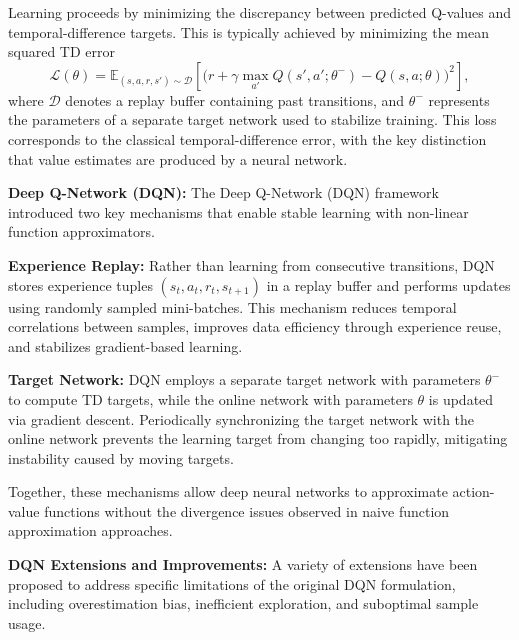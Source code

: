 Learning proceeds by minimizing the discrepancy between predicted Q-values and temporal-difference targets. This is typically achieved by minimizing the mean squared TD error
\begin{equation}
\mathcal{L}(\theta)
=
\mathbb{E}_{(s,a,r,s') \sim \mathcal{D}}
\left[
\big(
r + \gamma \max_{a'} Q(s',a';\theta^{-}) - Q(s,a;\theta)
\big)^2
\right],
\label{eq:dqn_loss}
\end{equation}
where $\mathcal{D}$ denotes a replay buffer containing past transitions, and $\theta^{-}$ represents the parameters of a separate target network used to stabilize training. This loss corresponds to the classical temporal-difference error, with the key distinction that value estimates are produced by a neural network.

\textbf{Deep Q-Network (DQN):}  
The Deep Q-Network (DQN) framework~\cite{mnih2015human} introduced two key mechanisms that enable stable learning with non-linear function approximators.

\textbf{Experience Replay:}  
Rather than learning from consecutive transitions, DQN stores experience tuples $(s_t, a_t, r_t, s_{t+1})$ in a replay buffer and performs updates using randomly sampled mini-batches. This mechanism reduces temporal correlations between samples, improves data efficiency through experience reuse, and stabilizes gradient-based learning.

\textbf{Target Network:}  
DQN employs a separate target network with parameters $\theta^{-}$ to compute TD targets, while the online network with parameters $\theta$ is updated via gradient descent. Periodically synchronizing the target network with the online network prevents the learning target from changing too rapidly, mitigating instability caused by moving targets.

Together, these mechanisms allow deep neural networks to approximate action-value functions without the divergence issues observed in naive function approximation approaches.

\textbf{DQN Extensions and Improvements:}  
A variety of extensions have been proposed to address specific limitations of the original DQN formulation, including overestimation bias, inefficient exploration, and suboptimal sample usage.

